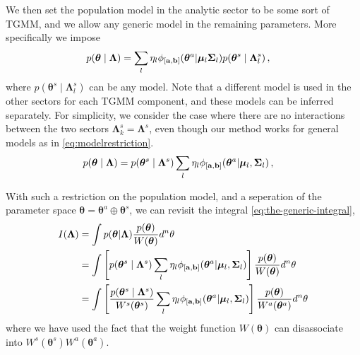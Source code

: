 \documentclass[twocolumn,usenames,dvipsnames,linenumbers]{aastex631}
\newcommand{\btheta}{\boldsymbol{\theta}}
\newcommand{\bmu}{\boldsymbol{\mu}}
\newcommand{\bSigma}{\boldsymbol{\Sigma}}
\newcommand{\bLambda}{\boldsymbol{\Lambda}}
\newcommand{\ba}{{\bf a}}
\newcommand{\bb}{{\bf b}}
\begin{document}
We then set the population model in the analytic sector to be some sort of \ac{TGMM}, and we allow any generic model in the remaining parameters. More specifically we impose
\begin{equation}
	\begin{aligned}
		p(\btheta \mid \bLambda) &= \sum_l \eta_l \phi_{[\ba, \bb]}(\btheta^a | \bmu_l \bSigma_l)  p(\btheta^s \mid \bLambda^s_l)\,,
	\end{aligned}
	\label{eq:modelrestriction}
\end{equation}
where $p(\btheta^s \mid \bLambda^s_l)$ can be any model. 
Note that a different model is used in the other sectors for each \ac{TGMM} component, and these models can be inferred separately. For simplicity, we consider the case where there are no interactions between the two sectors $\bLambda^s_k = \bLambda^s$, even though our method works for general models as in \eqref{eq:modelrestriction}.
\begin{equation}
	\begin{aligned}
		p(\btheta \mid \bLambda) &= p(\btheta^s \mid \bLambda^s)\sum_l \eta_l \phi_{[\ba, \bb]}(\btheta^a | \bmu_l, \bSigma_l) \,,
	\end{aligned}
	\label{eq:modelrestrictionextra}
\end{equation}

With such a restriction on the population model, and a seperation of the parameter space $\btheta = \btheta^a \oplus \btheta^s$, we can revisit the integral \eqref{eq:the-generic-integral},
\begin{equation}
\begin{aligned}
	I(\bLambda) &= \int p(\btheta | \bLambda) \frac{p(\btheta)}{W(\btheta)} d^n\theta \\
	&=  \int \left[p(\btheta^s \mid \bLambda^s)\sum_l \eta_l \phi_{[\ba, \bb]}(\btheta^a | \bmu_l, \bSigma_l)\right] \frac{p(\btheta)}{W(\btheta)} d^n\theta \\
	&=  \int \left[\frac{p(\btheta^s \mid \bLambda^s)}{W^s(\btheta^s)}\sum_l \eta_l \phi_{[\ba, \bb]}(\btheta^a | \bmu_l, \bSigma_l)\right] \frac{p(\btheta)}{W^a(\btheta^a)} d^n\theta \\
\end{aligned}
\end{equation} 
where we have used the fact that the weight function $W(\btheta)$ can disassociate into $W^s(\btheta^s)W^a(\btheta^a)$.
\end{document}
